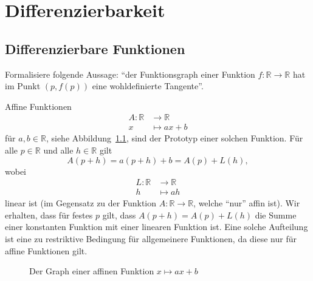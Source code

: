 \documentclass[../main.tex]{subfiles}
\begin{document}
\chapter{Differenzierbarkeit}
\section{Differenzierbare Funktionen}
\begin{goal}
  Formalisiere
  folgende Aussage:
  ``der Funktionsgraph einer Funktion
  $f \colon \mathbb{R} \to \mathbb{R}$
  hat im Punkt $(p, f(p))$ eine 
  wohldefinierte Tangente''.
\end{goal}

Affine Funktionen 
\begin{align*}
  A \colon \mathbb{R} & \to \mathbb{R} \\
  x & \mapsto ax + b
\end{align*}
für $a, b \in \mathbb{R}$,
siehe Abbildung~\ref{fig:affin},
sind der Prototyp
einer solchen Funktion.
Für alle $p \in \mathbb{R}$ und
alle $h \in \mathbb{R}$ gilt
\[
  A(p+h) = a(p+ h) + b = A(p) + L(h),
\]
wobei
\begin{align*}
  L \colon \mathbb{R} & \to \mathbb{R} \\
  h & \mapsto ah
\end{align*}
linear ist (im Gegensatz
zu der Funktion
$A \colon \mathbb{R} \to \mathbb{R}$,
welche ``nur'' affin ist).
Wir erhalten, dass für festes $p$ 
gilt, dass
  $A(p+h) = A(p) + L(h)$
die Summe einer konstanten
Funktion mit einer linearen Funktion ist.
Eine solche Aufteilung ist
eine zu restriktive Bedingung
für allgemeinere Funktionen,
da diese nur für affine Funktionen
gilt.


\begin{figure}[htb]
  \centering
  
  \caption{Der
  Graph einer affinen Funktion
$x \mapsto ax + b$}%
  \label{fig:affin}
\end{figure}
\end{document}
